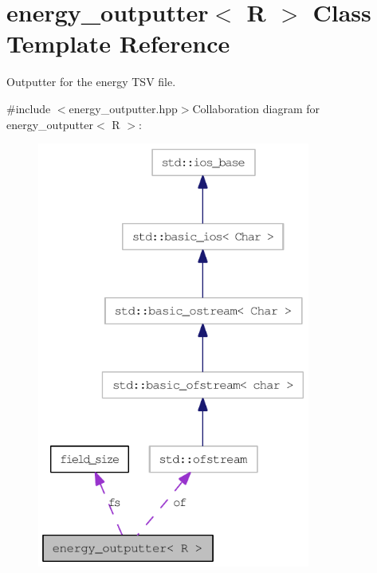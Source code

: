 \hypertarget{classenergy__outputter}{
\section{energy\_\-outputter$<$ R $>$ Class Template Reference}
\label{classenergy__outputter}
}


Outputter for the energy TSV file.  


{\ttfamily \#include $<$energy\_\-outputter.hpp$>$}Collaboration diagram for energy\_\-outputter$<$ R $>$:\nopagebreak
\begin{figure}[H]
\begin{center}
\leavevmode
\includegraphics[width=254pt]{classenergy__outputter__coll__graph}
\end{center}
\end{figure}
